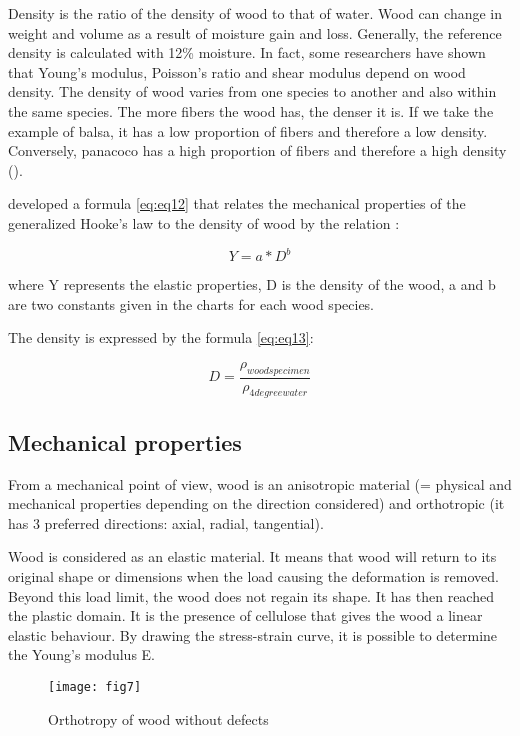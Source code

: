 Density is the ratio of the density of wood to that of water. Wood can change in weight and volume as a result of moisture gain and loss. Generally, the reference density is calculated with 12\% moisture. In fact, some researchers have shown that Young's modulus, Poisson's ratio and shear modulus depend on wood density. The density of wood varies from one species to another and also within the same species. The more fibers the wood has, the denser it is. If we take the example of balsa, it has a low proportion of fibers and therefore a low density. Conversely, panacoco has a high proportion of fibers and therefore a high density (\cite{Thibaut2015phd}).

\cite{BodigandJayne1982}  developed a formula \ref{eq:eq12} that relates the mechanical properties of the generalized Hooke's law to the density of wood by the relation :

\begin{equation}
	Y = a*D^b
	\label{eq:eq12}
\end{equation}

where Y represents the elastic properties, D is the density of the wood, a and b are two constants given in the charts for each wood species.

The density is expressed by the formula \ref{eq:eq13}:

\begin{equation}
	D = \frac{\rho_{woodspecimen}}{\rho_{4degreewater}}
	\label{eq:eq13}
\end{equation}

\subsection{Mechanical properties}

From a mechanical point of view, wood is an anisotropic material (= physical and mechanical properties depending on the direction considered) and orthotropic (it has 3 preferred directions: axial, radial, tangential). 

Wood is considered as an elastic material. It means that wood will return to its original shape or dimensions when the load causing the deformation is removed. Beyond this load limit, the wood does not regain its shape. It has then reached the plastic domain. It is the presence of cellulose that gives the wood a linear elastic behaviour. By drawing the stress-strain curve, it is possible to determine the Young's modulus E.


\begin{figure}[htp]
	\centering
	\texttt{[image: fig7]}
	\caption{Orthotropy of wood without defects \cite{Taazount2021}}
	\label{fig:fig7}
\end{figure}

